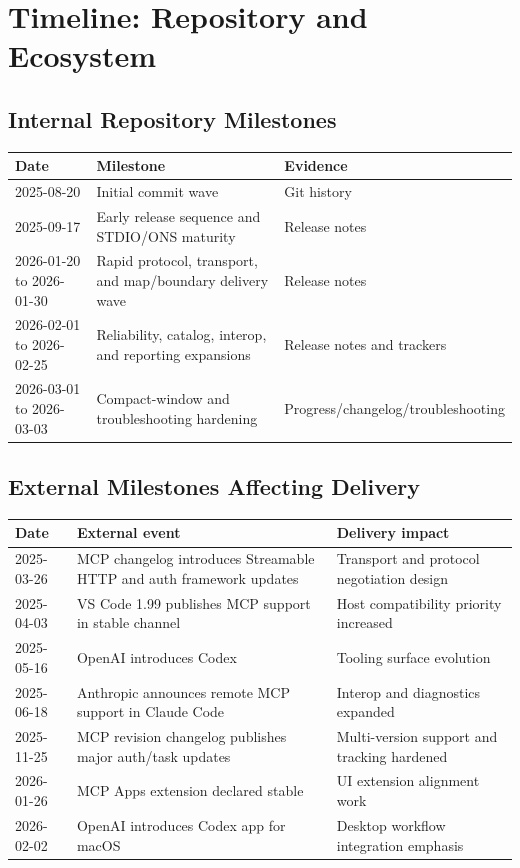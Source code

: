\chapter{Timeline: Repository and Ecosystem}
\label{ch:timeline}

\section{Internal Repository Milestones}

\begin{longtable}{p{2.5cm}p{4.5cm}p{7cm}}
\toprule
Date & Milestone & Evidence \\
\midrule
2025-08-20 & Initial commit wave & Git history \cite{repo_git_history} \\
2025-09-17 & Early release sequence and STDIO/ONS maturity & Release notes \cite{release_021} \\
2026-01-20 to 2026-01-30 & Rapid protocol, transport, and map/boundary delivery wave & Release notes \cite{release_022,release_026,release_028} \\
2026-02-01 to 2026-02-25 & Reliability, catalog, interop, and reporting expansions & Release notes and trackers \cite{release_029,release_040,progress_tracker} \\
2026-03-01 to 2026-03-03 & Compact-window and troubleshooting hardening & Progress/changelog/troubleshooting \cite{progress_tracker,changelog_master,troubleshooting_master} \\
\bottomrule
\end{longtable}

\section{External Milestones Affecting Delivery}

\begin{longtable}{p{2.5cm}p{5cm}p{6.5cm}}
\toprule
Date & External event & Delivery impact \\
\midrule
2025-03-26 & MCP changelog introduces Streamable HTTP and auth framework updates \cite{mcp_20250326_changelog} & Transport and protocol negotiation design \\
2025-04-03 & VS Code 1.99 publishes MCP support in stable channel \cite{vscode_199} & Host compatibility priority increased \\
2025-05-16 & OpenAI introduces Codex \cite{openai_codex_intro} & Tooling surface evolution \\
2025-06-18 & Anthropic announces remote MCP support in Claude Code \cite{anthropic_remote_mcp} & Interop and diagnostics expanded \\
2025-11-25 & MCP revision changelog publishes major auth/task updates \cite{mcp_20251125_changelog} & Multi-version support and tracking hardened \\
2026-01-26 & MCP Apps extension declared stable \cite{mcp_updates_blog} & UI extension alignment work \\
2026-02-02 & OpenAI introduces Codex app for macOS \cite{openai_codex_app} & Desktop workflow integration emphasis \\
\bottomrule
\end{longtable}
